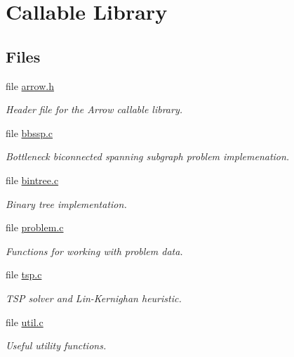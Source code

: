 \hypertarget{group__lib}{
\section{Callable Library}
\label{group__lib}
}
\subsection*{Files}
\begin{CompactItemize}
\item 
file \hyperlink{arrow_8h}{arrow.h}
\begin{CompactList}\small\item\em Header file for the Arrow callable library. \item\end{CompactList}

\item 
file \hyperlink{lib_2bbssp_8c}{bbssp.c}
\begin{CompactList}\small\item\em Bottleneck biconnected spanning subgraph problem implemenation. \item\end{CompactList}

\item 
file \hyperlink{bintree_8c}{bintree.c}
\begin{CompactList}\small\item\em Binary tree implementation. \item\end{CompactList}

\item 
file \hyperlink{problem_8c}{problem.c}
\begin{CompactList}\small\item\em Functions for working with problem data. \item\end{CompactList}

\item 
file \hyperlink{tsp_8c}{tsp.c}
\begin{CompactList}\small\item\em TSP solver and Lin-Kernighan heuristic. \item\end{CompactList}

\item 
file \hyperlink{util_8c}{util.c}
\begin{CompactList}\small\item\em Useful utility functions. \item\end{CompactList}

\end{CompactItemize}
